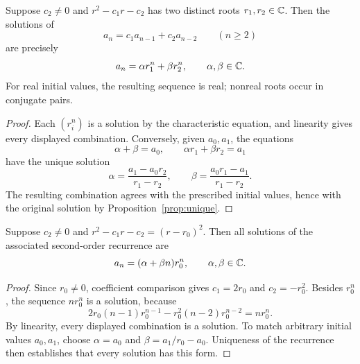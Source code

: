 \documentclass[11pt, oneside]{article}
\begin{document}
\begin{theorem}\label{thm:distinct2}
Suppose $c_2\ne0$ and $r^2-c_1r-c_2$ has two distinct roots $r_1, r_2\in\mathbb{C}$. Then the solutions of
\[
a_n=c_1a_{n-1}+c_2a_{n-2}\qquad(n\ge2)
\]
are precisely
\[
a_n=\alpha r_1^n+\beta r_2^n, \qquad\alpha, \beta\in\mathbb{C}.
\]
For real initial values, the resulting sequence is real; nonreal roots occur in conjugate pairs.
\end{theorem}
\begin{proof}
Each $(r_i^n)$ is a solution by the characteristic equation, and linearity gives every displayed combination. Conversely, given $a_0, a_1$, the equations
\[
\alpha+\beta=a_0, \qquad\alpha r_1+\beta r_2=a_1
\]
have the unique solution
\[
\alpha=\frac{a_1-a_0r_2}{r_1-r_2}, \qquad
\beta=\frac{a_0r_1-a_1}{r_1-r_2}.
\]
The resulting combination agrees with the prescribed initial values, hence with the original solution by Proposition~\ref{prop:unique}.
\end{proof}

\begin{theorem}\label{thm:repeated2}
Suppose $c_2\ne0$ and $r^2-c_1r-c_2=(r-r_0)^2$. Then all solutions of the associated second-order recurrence are
\[
a_n=(\alpha+\beta n)r_0^n, \qquad\alpha, \beta\in\mathbb{C}.
\]
\end{theorem}
\begin{proof}
Since $r_0\ne0$, coefficient comparison gives $c_1=2r_0$ and $c_2=-r_0^2$. Besides $r_0^n$, the sequence $nr_0^n$ is a solution, because
\[
2r_0(n-1)r_0^{n-1}-r_0^2(n-2)r_0^{n-2}
=nr_0^n.
\]
By linearity, every displayed combination is a solution. To match arbitrary initial values $a_0, a_1$, choose $\alpha=a_0$ and $\beta=a_1/r_0-a_0$. Uniqueness of the recurrence then establishes that every solution has this form.
\end{proof}
\end{document}

